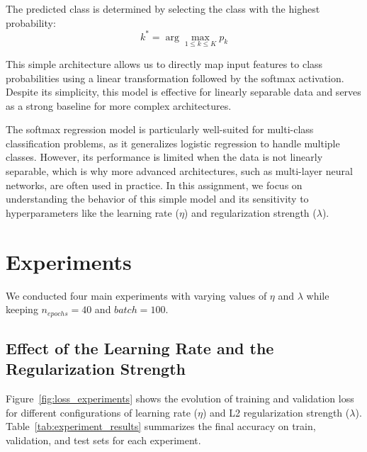 \documentclass{article}
\begin{document}
The predicted class is determined by selecting the class with the highest probability:
\[
k^* = \arg\max_{1 \leq k \leq K} p_k
\]

This simple architecture allows us to directly map input features to class probabilities using a linear transformation followed by the softmax activation. Despite its simplicity, this model is effective for linearly separable data and serves as a strong baseline for more complex architectures.

The softmax regression model is particularly well-suited for multi-class classification problems, as it generalizes logistic regression to handle multiple classes. However, its performance is limited when the data is not linearly separable, which is why more advanced architectures, such as multi-layer neural networks, are often used in practice. In this assignment, we focus on understanding the behavior of this simple model and its sensitivity to hyperparameters like the learning rate ($\eta$) and regularization strength ($\lambda$).

\section{Experiments}
We conducted four main experiments with varying values of $\eta$ and $\lambda$ while keeping $n_{epochs}=40$ and $batch=100$.

\subsection{Effect of the Learning Rate and the Regularization Strength}

Figure~\ref{fig:loss_experiments} shows the evolution of training and validation loss for different configurations of learning rate ($\eta$) and L2 regularization strength ($\lambda$). Table~\ref{tab:experiment_results} summarizes the final accuracy on train, validation, and test sets for each experiment.
\end{document}

